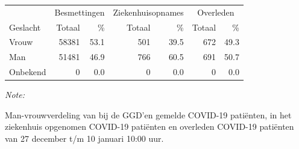 \documentclass[
  english,
  man,floatsintext]{apa6}
\begin{document}
\begin{table}[H]
\centering\begingroup\fontsize{11}{13}\selectfont

\begin{threeparttable}
\begin{tabular}{lrrrrrr}
\toprule
\multicolumn{1}{c}{ } & \multicolumn{2}{c}{Besmettingen} & \multicolumn{2}{c}{Ziekenhuisopnames} & \multicolumn{2}{c}{Overleden} \\
\cmidrule(l{3pt}r{3pt}){2-3} \cmidrule(l{3pt}r{3pt}){4-5} \cmidrule(l{3pt}r{3pt}){6-7}
Geslacht & Totaal & \% & Totaal & \% & Totaal & \%\\
\midrule
Vrouw & 58381 & 53.1 & 501 & 39.5 & 672 & 49.3\\
Man & 51481 & 46.9 & 766 & 60.5 & 691 & 50.7\\
Onbekend & 0 & 0.0 & 0 & 0.0 & 0 & 0.0\\
\bottomrule
\end{tabular}
\begin{tablenotes}
\item \textit{Note: } 
\item Man-vrouwverdeling van bij de GGD’en gemelde COVID-19 patiënten, in het ziekenhuis opgenomen COVID-19 patiënten en overleden COVID-19 patiënten van 27 december t/m 10 januari 10:00 uur.
\end{tablenotes}
\end{threeparttable}
\endgroup{}
\end{table}
\newpage
\end{document}
